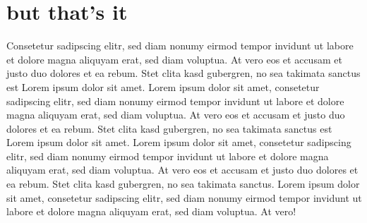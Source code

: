 \documentclass[10pt,twoside,twocolumn,openany,nodeprecatedcode]{dndbook}
\begin{document}
\section{but that's it} \label{sec:but_that's_it}
Consetetur sadipscing elitr, sed diam nonumy eirmod tempor invidunt ut labore et dolore magna aliquyam erat, sed diam voluptua. At vero eos et accusam et justo duo dolores et ea rebum. Stet clita kasd gubergren, no sea takimata sanctus est Lorem ipsum dolor sit amet. Lorem ipsum dolor sit amet, consetetur sadipscing elitr, sed diam nonumy eirmod tempor invidunt ut labore et dolore magna aliquyam erat, sed diam voluptua. At vero eos et accusam et justo duo dolores et ea rebum. Stet clita kasd gubergren, no sea takimata sanctus est Lorem ipsum dolor sit amet. Lorem ipsum dolor sit amet, consetetur sadipscing elitr, sed diam nonumy eirmod tempor invidunt ut labore et dolore magna aliquyam erat, sed diam voluptua. At vero eos et accusam et justo duo dolores et ea rebum. Stet clita kasd gubergren, no sea takimata sanctus.
Lorem ipsum dolor sit amet, consetetur sadipscing elitr, sed diam nonumy eirmod tempor invidunt ut labore et dolore magna aliquyam erat, sed diam voluptua. At vero!
\end{document}
